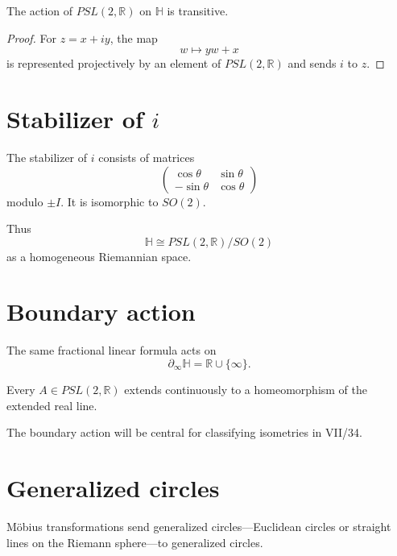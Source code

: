 \begin{theorem}\label{thm:vii33-transitive}
The action of \(PSL(2,\mathbb R)\) on \(\mathbb H\) is transitive.
\end{theorem}

\begin{proof}
For \(z=x+iy\), the map
\[
w\longmapsto yw+x
\]
is represented projectively by an element of \(PSL(2,\mathbb R)\) and sends
\(i\) to \(z\).
\end{proof}

\section{Stabilizer of \(i\)}

\begin{theorem}\label{thm:vii33-stabilizer}
The stabilizer of \(i\) consists of matrices
\[
\begin{pmatrix}
\cos\theta&\sin\theta\\
-\sin\theta&\cos\theta
\end{pmatrix}
\]
modulo \(\pm I\).  It is isomorphic to \(SO(2)\).
\end{theorem}

Thus
\[
\mathbb H
\cong
PSL(2,\mathbb R)/SO(2)
\]
as a homogeneous Riemannian space.

\section{Boundary action}

The same fractional linear formula acts on
\[
\partial_\infty\mathbb H
=
\mathbb R\cup\{\infty\}.
\]

\begin{proposition}\label{prop:vii33-boundary}
Every \(A\in PSL(2,\mathbb R)\) extends continuously to a homeomorphism of the
extended real line.
\end{proposition}

The boundary action will be central for classifying isometries in VII/34.

\section{Generalized circles}

\begin{theorem}\label{thm:vii33-circles}
Möbius transformations send generalized circles---Euclidean circles or straight
lines on the Riemann sphere---to generalized circles.
\end{theorem}

